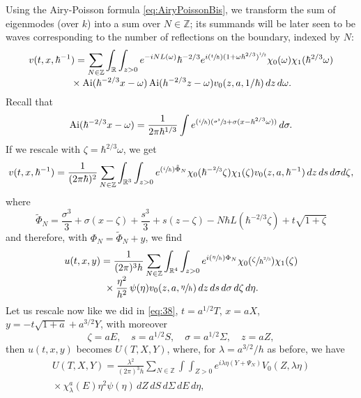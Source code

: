\documentclass[JEP,XML,SOM,Unicode,NoEqCountersInSection,NoFloatCountersInSection,published]{cedram}
\newcommand{\Psfrac}[2]{(\sfrac{#1}{#2})}
\DeclareMathOperator{\Ai}{Ai}
\newcommand\R{{\mathbb R}}
\newcommand\Z{{\mathbb Z}}
\theoremstyle{plain}
\theoremstyle{definition}
\begin{document}
Using the Airy-Poisson formula \eqref{eq:AiryPoissonBis}, we transform the sum of eigenmodes (over $k$) into a sum over $N\in \Z$; its summands will be later seen to be waves corresponding to the number of reflections on the boundary, indexed by $N$:
\begin{multline*}
v(t,x,\hbar^{-1})= \sum_{N\in \Z} \int_{\R}\int_{{z}>0} e^{-i NL(\omega)} \hbar^{-2/3} e^{i\Psfrac t \hbar (1+\omega \hbar^{2/3})^{\sfrac 1 2}} \chi_{0}(\omega)\chi_{1}(\hbar^{2/3}\omega)\\[
-3pt]
{}\times\Ai(\hbar^{-2/3} x-\omega) \Ai(h^{-2/3}{z}-\omega) v_{0}({z},a,1/\hbar) \,d{z} \,d\omega.
\end{multline*}
Recall that
\begin{equation*}
\label{eq:47}
\Ai(\hbar^{-2/3} x-\omega)=\frac 1 {2\pi \hbar^{1/3} } \int e^{\Psfrac i \hbar (\sfrac{\sigma^{3}}{3}+\sigma(x-\hbar^{2/3}\omega))} \,d\sigma.
\end{equation*}
If we rescale with $\zeta=\hbar^{2/3} \omega$, we get
\begin{equation*}
\label{eq:48}
v(t,x,\hbar^{-1})
= \frac 1 {(2\pi\hbar)^{2}} \sum_{N\in \Z} \int_{\R^{3}}\int_{{z}>0} e^{\Psfrac i \hbar \tilde \Phi_{N}} \chi_{0}(\hbar^{-\sfrac 23}\zeta)\chi_{1}(\zeta) v_{0}({z},a,\hbar^{-1}) \,dz \,ds \,d\sigma d{\zeta},
\end{equation*}
where
\begin{equation*}
\label{eq:49}
\tilde \Phi_{N}=\frac{\sigma^{3}} 3+\sigma(x-\zeta)+\frac {s^{3}} 3+s({z}-\zeta)-N\hbar L(\hbar^{-2/3} \zeta)+t \sqrt{1+\zeta}
\end{equation*}
and therefore, with $\Phi_{N}=\tilde\Phi_{N}+y$, we find
\begin{multline*}
u(t,x,y)
= \frac 1 {(2\pi)^{3}h} \sum_{N\in \Z} \int_{\R^{4}}\int_{{z}>0}e^{i \Psfrac \eta h \Phi_{N}} \chi_{0}(\sfrac {\zeta} {\hbar^{\sfrac 23}})\chi_{1}(\zeta)\\[-5pt]
{}\times\frac {\eta^{2}} {h^{2}}\,{\psi(\eta)} v_{0}({z},a,\sfrac \eta h) \,dz \,ds \,d\sigma \,d\zeta \,d\eta.
\end{multline*}
Let us rescale now like we did in \eqref{eq:38}, $t=a^{1/2} T$, $x=aX$, $y=-t\sqrt{1+a}+a^{3/2}Y$, with moreover
\begin{equation*}
\label{eq:50}
\zeta=a E,\quad s=a^{1/2}S,\quad \sigma =a^{1/2} \Sigma,\quad {z}=a {Z},
\end{equation*}
then $u(t,x,y)$ becomes $U(T,X,Y)$, where, for $\lambda=a^{3/2}/h$ as before, we have
\begin{multline}
\label{eq:51}
U(T,X,Y)= \frac {\lambda^{2}} {(2\pi)^{3}h} \sum_{N\in \Z} \int \int_{Z>0} e^{i\lambda \eta (Y+\Psi_{N})}V_{0}({Z},\lambda \eta) \\[
-3pt]
 {}\times
\chi_{\lambda}^{a}(E) \eta^{2} \psi(\eta) \,dZ \,dS \,d\Sigma \,dE \,d\eta,
\end{multline}
\end{document}
